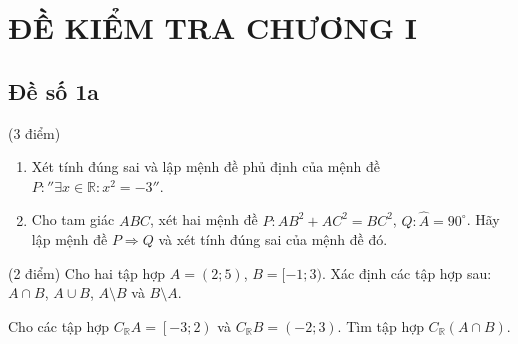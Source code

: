 \section{ĐỀ KIỂM TRA CHƯƠNG I}
\subsection{Đề số 1a}
	\begin{bt}%
		(3 điểm) 		
		\begin{enumerate}
			\item Xét tính đúng sai và lập mệnh đề phủ định của mệnh đề $P:'' \exists x\in \mathbb{R}: x^2=-3''$.
			\item Cho tam giác $ABC$, xét hai mệnh đề $P: AB^2+AC^2=BC^2$, $Q: \widehat{A}=90^\circ$. Hãy lập mệnh đề $P\Rightarrow Q$ và xét tính đúng sai của mệnh đề đó.
		\end{enumerate}
	\end{bt}
	
	\begin{bt}%
		(2 điểm) 		
	 Cho hai tập hợp $A=(2;5)$, $B=[-1;3)$. Xác định các tập hợp sau: $A\cap B$, $A\cup B$, $A\setminus B$ và $B\setminus A$.
		\loigiai{$A\cap B=(2;3)$, $A\cup B=[-1;5)$, $A\setminus B=[3;5)$, $B\setminus A=[-1;2]$.
		}
	\end{bt}
\begin{bt}%
	Cho các tập hợp $C_{\mathbb{R}} A =\left[ -3;2 \right)$ và $C_{\mathbb{R}}B =\left(-2;3 \right)$. Tìm tập hợp $C_{\mathbb{R}}\left( A\cap B \right)$.
	\loigiai{Tập hợp $C_{\mathbb{R}} A =\left[ -3;2 \right) \Rightarrow A=\left( -\infty;-3 \right)\cup \left[ {2; +\infty}\right)$.\\
		Tập hợp $C_{\mathbb{R}}B =\left(-2;3 \right)\Rightarrow B=\left( -\infty;-2 \right]\cup \left[ {3; +\infty}\right)$.\\
		Tập hợp $A \cap B= \left( -\infty;-3 \right)\cup \left[ {3; +\infty}\right) \Rightarrow C_{\mathbb{R}}\left( {A \cap B}\right)= \left[ {-3; 3}\right)$.}
\end{bt}

